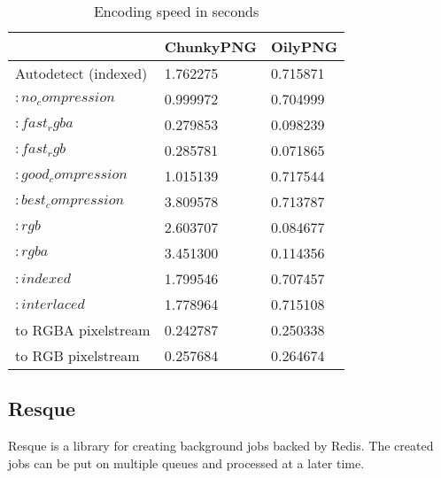 \begin{table}[ht!]
\centering
\caption{Encoding speed in seconds}
{
\renewcommand{\arraystretch}{1.25}
\begin{tabular}{ lll }
                        & ChunkyPNG   &   OilyPNG \\ \hline
Autodetect (indexed)    & 1.762275    & 0.715871 \\
$:no_compression$       & 0.999972    & 0.704999 \\
$:fast_rgba$            & 0.279853    & 0.098239 \\
$:fast_rgb$             & 0.285781    & 0.071865 \\
$:good_compression$     & 1.015139    & 0.717544 \\
$:best_compression$     & 3.809578    & 0.713787 \\
$:rgb$                  & 2.603707    & 0.084677 \\
$:rgba$                 & 3.451300    & 0.114356 \\
$:indexed$              & 1.799546    & 0.707457 \\
$:interlaced$           & 1.778964    & 0.715108 \\
to RGBA pixelstream     & 0.242787    & 0.250338 \\
to RGB pixelstream      & 0.257684    & 0.264674 \\
\end{tabular}
}
\label{encoding_speed}
\end{table}



\subsection{Resque}

Resque is a library for creating background jobs backed by Redis. The created jobs can be put on multiple queues and processed at a later time.




